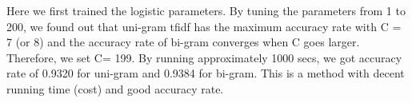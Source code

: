 
Here we first trained the logistic parameters. By tuning the parameters from 1 to 200, we found out that uni-gram tfidf has the maximum accuracy rate with C = 7 (or 8) and the accuracy rate of bi-gram converges when C goes larger. Therefore, we set C= 199. By running approximately 1000 secs, we got accuracy rate of 0.9320 for uni-gram and 0.9384 for bi-gram. This is a method with decent running time (cost) and good accuracy rate. \\